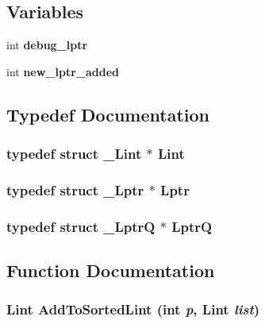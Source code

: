 \subsection*{Variables}
\begin{CompactItemize}
\item 
int \bf{debug\_\-lptr}
\item 
int \bf{new\_\-lptr\_\-added}
\end{CompactItemize}


\subsection{Typedef Documentation}
\subsubsection{\setlength{\rightskip}{0pt plus 5cm}typedef struct \bf{\_\-Lint} $\ast$ \bf{Lint}}\label{llist_8h_60acccd5ce3d5fac5daae7eb1b6e0264}


\subsubsection{\setlength{\rightskip}{0pt plus 5cm}typedef struct \bf{\_\-Lptr} $\ast$ \bf{Lptr}}\label{llist_8h_1de086bcdcfc8abbab5d7c751671e146}


\subsubsection{\setlength{\rightskip}{0pt plus 5cm}typedef struct \bf{\_\-Lptr\-Q} $\ast$ \bf{Lptr\-Q}}\label{llist_8h_40e76968b0012f4efc3c556fc6a18896}




\subsection{Function Documentation}
\subsubsection{\setlength{\rightskip}{0pt plus 5cm}\bf{Lint} Add\-To\-Sorted\-Lint (int {\em p}, \bf{Lint} {\em list})}\label{llist_8h_144989866b0bd3f6c2848978d8525046}




